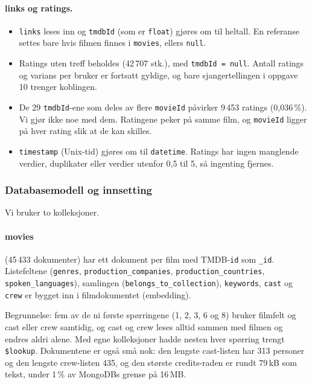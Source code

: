 \documentclass[11pt,a4paper]{article}
\begin{document}
\paragraph{links og ratings.}
\begin{itemize}
  \item \texttt{links} leses inn og \texttt{tmdbId} (som er \texttt{float}) gjøres om til heltall. En referanse settes bare hvis filmen finnes i \texttt{movies}, ellers \texttt{null}.
  \item Ratings uten treff beholdes (42\,707 stk.), med \texttt{tmdbId = null}. Antall ratings og varians per bruker er fortsatt gyldige, og bare sjangertellingen i oppgave 10 trenger koblingen.
  \item De 29 \texttt{tmdbId}-ene som deles av flere \texttt{movieId} påvirker 9\,453 ratings (0,036\,\%). Vi gjør ikke noe med dem. Ratingene peker på samme film, og \texttt{movieId} ligger på hver rating slik at de kan skilles.
  \item \texttt{timestamp} (Unix-tid) gjøres om til \texttt{datetime}. Ratings har ingen manglende verdier, duplikater eller verdier utenfor 0,5 til 5, så ingenting fjernes.
\end{itemize}

\FloatBarrier
\subsubsection{Databasemodell og innsetting}
Vi bruker to kolleksjoner.

\paragraph{movies} (45\,433 dokumenter) har ett dokument per film med TMDB-\texttt{id} som \texttt{\_id}. Listefeltene (\texttt{genres}, \texttt{production\_companies}, \texttt{production\_countries}, \texttt{spoken\_languages}), samlingen (\texttt{belongs\_to\_collection}), \texttt{keywords}, \texttt{cast} og \texttt{crew} er bygget inn i filmdokumentet (embedding).

Begrunnelse: fem av de ni første spørringene (1, 2, 3, 6 og 8) bruker filmfelt og cast eller crew samtidig, og cast og crew leses alltid sammen med filmen og endres aldri alene. Med egne kolleksjoner hadde nesten hver spørring trengt \texttt{\$lookup}. Dokumentene er også små nok: den lengste cast-listen har 313 personer og den lengste crew-listen 435, og den største credits-raden er rundt 79\,kB som tekst, under 1\,\% av MongoDBs grense på 16\,MB.
\end{document}
